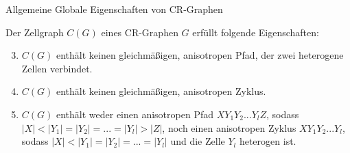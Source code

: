 \documentclass{beamer}
\begin{document}
	\begin{frame}{Allgemeine Globale Eigenschaften von CR-Graphen}
		\begin{Lemma}
			Der Zellgraph $C(G)$ eines CR-Graphen $G$ erfüllt folgende Eigenschaften:
			
			\begin{enumerate}[label=(\Alph*)]
				\setcounter{enumi}{2}
				\item $C(G)$ enthält keinen gleichmäßigen, anisotropen Pfad, der zwei heterogene Zellen verbindet.
				\item $C(G)$ enthält keinen gleichmäßigen, anisotropen Zyklus.
				\item $C(G)$ enthält weder einen anisotropen Pfad $XY_1Y_2...Y_lZ$, sodass $|X|<|Y_1|=|Y_2|=...=|Y_l|>|Z|$, noch einen anisotropen Zyklus $XY_1Y_2...Y_l$, sodass $|X|<|Y_1|=|Y_2|=...=|Y_l|$ und die Zelle $Y_l$ heterogen ist.
			\end{enumerate}
		\end{Lemma}
	\end{frame}
\end{document}
